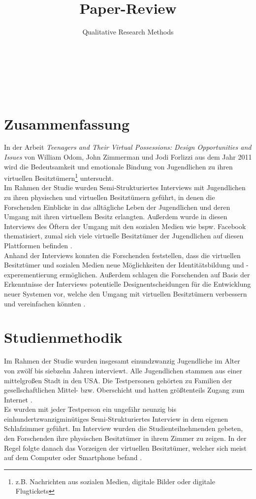 \documentclass{hsflensburg}
\title{Paper-Review}
\subtitle{Qualitative Research Methods}
\author{
	\name{Tom Hartelt}\\
	\institution{Hochschule Flensburg}
	\and
	\name{Martin Hermannsen}\\
	\institution{Hochschule Flensburg}
	\and
	\name{Michael Frank}\\
	\institution{Hochschule Flensburg}
}
\begin{document}
	\maketitle
 	 \tableofcontents

  \pagebreak
	
	\section{Zusammenfassung}
	In der Arbeit \textit{Teenagers and Their Virtual Possessions: Design Opportunities and Issues} von
 	William Odom, John Zimmerman und Jodi Forlizzi aus dem Jahr 2011 wird die Bedeutsamkeit 
	und emotionale Bindung von Jugendlichen zu ihren virtuellen Besitztümern\footnote{ z.B. Nachrichten aus sozialen Medien, digitale Bilder oder digitale Flugtickets} untersucht.\\
	Im Rahmen der Studie wurden Semi-Strukturiertes Interviews mit  Jugendlichen zu ihren physischen und virtuellen Besitztümern 	geführt, in denen die Forschenden Einblicke in das alltägliche Leben der 
	Jugendlichen und deren Umgang mit ihren virtuellem Besitz erlangten. Außerdem wurde
	 in diesen Interviews des Öftern der Umgang mit den sozialen Medien wie bspw. Facebook thematisiert, zumal sich viele virtuelle Besitztümer der Jugendlichen auf diesen Plattformen befinden 
	\cite{odom2011teenagers}. \\

	Anhand der Interviews konnten die Forschenden feststellen, dass die 
	virtuellen Besitztümer und sozialen Medien neue Möglichkeiten der Identitätsbildung 
	und -experementierung ermöglichen. Außerdem schlagen die Forschenden auf Basis der 
	Erkenntnisse der Interviews potentielle Designentscheidungen für die 
	Entwicklung neuer Systemen vor, welche den Umgang mit virtuellen 
	Besitztümern verbessern und vereinfachen könnten \cite{odom2011teenagers}. 


	\section{Studienmethodik}
	Im Rahmen der Studie  wurden insgesamt einundzwanzig Jugendliche im Alter
	von zwölf bis siebzehn Jahren interviewt. Alle Jugendlichen stammen
	aus einer mittelgroßen Stadt in den USA. Die Testpersonen gehörten zu Familien
	der gesellschaftlichen Mittel- bzw. Oberschicht und hatten größtenteils Zugang 
	zum Internet \cite{odom2011teenagers}. \\

	Es wurden mit jeder Testperson ein ungefähr neunzig bis einhundertzwanzigminütiges
	Semi-Strukturiertes Interview in dem eigenen Schlafzimmer geführt. Im Interview
	wurden die Studienteilnehmenden gebeten, den Forschenden ihre physischen Besitztümer
	in ihrem Zimmer zu zeigen. In der Regel folgte danach das Vorzeigen der
	virtuellen Besitztümer, welcher sich meist auf dem Computer oder Smartphone befand 
	\cite{odom2011teenagers}. \\
\end{document}
